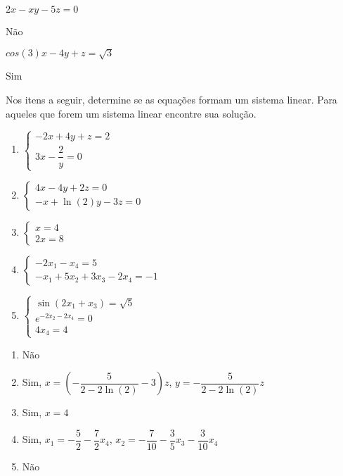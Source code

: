 \documentclass[12pt]{exam}
\begin{document}
\begin{exercicio}
    $2x - xy - 5z = 0$
    \begin{solucao}
        Não
    \end{solucao}
\end{exercicio}

\begin{exercicio}\label{fimequacoeslineares}
    $cos(3)x - 4y + z = \sqrt{3}$
    \begin{solucao}
        Sim
    \end{solucao}
\end{exercicio}

\begin{exercicio}
  Nos itens a seguir, determine se as equações formam um sistema linear. Para aqueles que forem um sistema linear encontre sua solução.
  \begin{enumerate}[label={\alph*})]
    \item $\begin{cases} -2x + 4y + z = 2\\ 3x - \dfrac{2}{y} = 0\end{cases}$
    \item $\begin{cases} 4x - 4y + 2z = 0\\ -x + \ln(2)y - 3z = 0\end{cases}$
    \item $\begin{cases} x = 4\\ 2x = 8\end{cases}$
    \item $\begin{cases} -2x_1 - x_4 = 5\\ -x_1 + 5x_2 + 3x_3 - 2x_4 = -1\end{cases}$
    \item $\begin{cases} \sin(2x_1 + x_3) = \sqrt{5}\\ e^{-2x_2 - 2x_4} = 0\\ 4x_4 = 4\end{cases}$
  \end{enumerate}
  \begin{solucao}
    \begin{enumerate}[label={\alph*})]
      \item Não
    \item Sim, $x = \left(-\dfrac{5}{2 - 2\ln(2)} - 3\right)z$, $y = -\dfrac{5}{2 - 2\ln(2)}z$
      \item Sim, $x = 4$
      \item Sim, $x_1 = -\dfrac{5}{2} - \dfrac{7}{2}x_4$, $x_2 = -\dfrac{7}{10} - \dfrac{3}{5}x_3 - \dfrac{3}{10}x_4$
      \item Não
    \end{enumerate}
  \end{solucao}
\end{exercicio}
\end{document}
